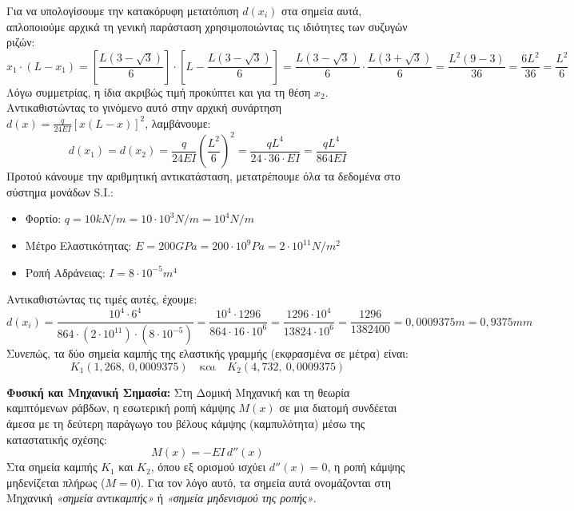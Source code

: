 \begin{alist}
Για να υπολογίσουμε την κατακόρυφη μετατόπιση $d(x_i)$ στα σημεία αυτά, απλοποιούμε αρχικά τη γενική παράσταση χρησιμοποιώντας τις ιδιότητες των συζυγών ριζών:
\[x_1 \cdot (L - x_1) = \left[\frac{L(3-\sqrt{3})}{6}\right] \cdot \left[L - \frac{L(3-\sqrt{3})}{6}\right] = \frac{L(3-\sqrt{3})}{6} \cdot \frac{L(3+\sqrt{3})}{6} = \frac{L^2(9-3)}{36} = \frac{6L^2}{36} = \frac{L^2}{6}\]
Λόγω συμμετρίας, η ίδια ακριβώς τιμή προκύπτει και για τη θέση $x_2$. 
Αντικαθιστώντας το γινόμενο αυτό στην αρχική συνάρτηση $d(x)=\frac{q}{24EI}[x(L-x)]^2$, λαμβάνουμε:
\[d(x_1) = d(x_2) = \frac{q}{24EI} \left(\frac{L^2}{6}\right)^2 = \frac{q L^4}{24 \cdot 36 \cdot EI} = \frac{q L^4}{864 EI}\]
Προτού κάνουμε την αριθμητική αντικατάσταση, μετατρέπουμε όλα τα δεδομένα στο σύστημα μονάδων S.I.:
\begin{itemize}
  \item Φορτίο: $q = 10\si{kN/m} = 10 \cdot 10^3\si{N/m} = 10^4\si{N/m}$
  \item Μέτρο Ελαστικότητας: $E = 200\si{GPa} = 200 \cdot 10^9\si{Pa} = 2 \cdot 10^{11}\si{N/m^2}$
  \item Ροπή Αδράνειας: $I = 8 \cdot 10^{-5}\si{m^4}$
\end{itemize}
Αντικαθιστώντας τις τιμές αυτές, έχουμε:
\[d(x_i) = \frac{10^4 \cdot 6^4}{864 \cdot (2 \cdot 10^{11}) \cdot (8 \cdot 10^{-5})} = \frac{10^4 \cdot 1296}{864 \cdot 16 \cdot 10^6} = \frac{1296 \cdot 10^4}{13824 \cdot 10^6} = \frac{1296}{1382400} = 0{,}0009375\si{m} = 0{,}9375\si{mm}\]
Συνεπώς, τα δύο σημεία καμπής της ελαστικής γραμμής (εκφρασμένα σε μέτρα) είναι:
\[K_1(1{,}268, \ 0{,}0009375) \quad \text{και} \quad K_2(4{,}732, \ 0{,}0009375)\]

\item \textbf{Φυσική και Μηχανική Σημασία:}
Στη Δομική Μηχανική και τη θεωρία καμπτόμενων ράβδων, η εσωτερική ροπή κάμψης $M(x)$ σε μια διατομή συνδέεται άμεσα με τη δεύτερη παράγωγο του βέλους κάμψης (καμπυλότητα) μέσω της καταστατικής σχέσης:
\[M(x) = -EI \, d''(x)\]
Στα σημεία καμπής $K_1$ και $K_2$, όπου εξ ορισμού ισχύει $d''(x)=0$, η ροπή κάμψης μηδενίζεται πλήρως ($M=0$). Για τον λόγο αυτό, τα σημεία αυτά ονομάζονται στη Μηχανική \emph{«σημεία αντικαμπής»} ή \emph{«σημεία μηδενισμού της ροπής»}.
\end{alist}

